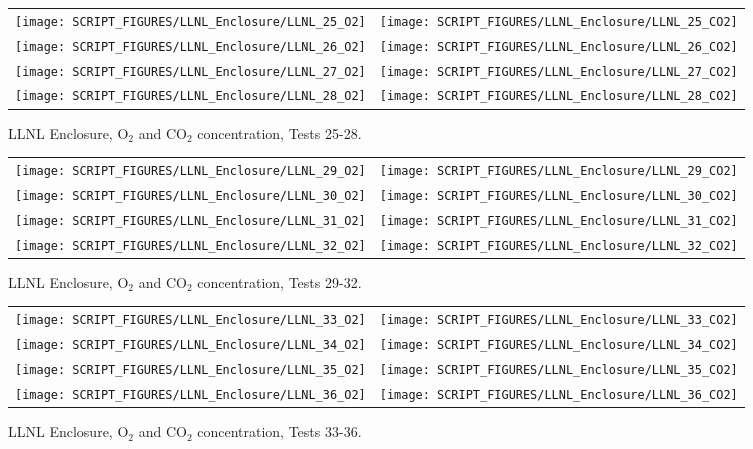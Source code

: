 \begin{figure}[p]
\begin{tabular*}{\textwidth}{l@{\extracolsep{\fill}}r}
\texttt{[image: SCRIPT\_FIGURES/LLNL\_Enclosure/LLNL\_25\_O2]} &
\texttt{[image: SCRIPT\_FIGURES/LLNL\_Enclosure/LLNL\_25\_CO2]} \\
\texttt{[image: SCRIPT\_FIGURES/LLNL\_Enclosure/LLNL\_26\_O2]} &
\texttt{[image: SCRIPT\_FIGURES/LLNL\_Enclosure/LLNL\_26\_CO2]} \\
\texttt{[image: SCRIPT\_FIGURES/LLNL\_Enclosure/LLNL\_27\_O2]} &
\texttt{[image: SCRIPT\_FIGURES/LLNL\_Enclosure/LLNL\_27\_CO2]} \\
\texttt{[image: SCRIPT\_FIGURES/LLNL\_Enclosure/LLNL\_28\_O2]} &
\texttt{[image: SCRIPT\_FIGURES/LLNL\_Enclosure/LLNL\_28\_CO2]}
\end{tabular*}
\caption{LLNL Enclosure, O$_2$ and CO$_2$ concentration, Tests 25-28.}
\label{LLNL_Gas_7}
\end{figure}

\begin{figure}[p]
\begin{tabular*}{\textwidth}{l@{\extracolsep{\fill}}r}
\texttt{[image: SCRIPT\_FIGURES/LLNL\_Enclosure/LLNL\_29\_O2]} &
\texttt{[image: SCRIPT\_FIGURES/LLNL\_Enclosure/LLNL\_29\_CO2]} \\
\texttt{[image: SCRIPT\_FIGURES/LLNL\_Enclosure/LLNL\_30\_O2]} &
\texttt{[image: SCRIPT\_FIGURES/LLNL\_Enclosure/LLNL\_30\_CO2]} \\
\texttt{[image: SCRIPT\_FIGURES/LLNL\_Enclosure/LLNL\_31\_O2]} &
\texttt{[image: SCRIPT\_FIGURES/LLNL\_Enclosure/LLNL\_31\_CO2]} \\
\texttt{[image: SCRIPT\_FIGURES/LLNL\_Enclosure/LLNL\_32\_O2]} &
\texttt{[image: SCRIPT\_FIGURES/LLNL\_Enclosure/LLNL\_32\_CO2]}
\end{tabular*}
\caption{LLNL Enclosure, O$_2$ and CO$_2$ concentration, Tests 29-32.}
\label{LLNL_Gas_8}
\end{figure}

\begin{figure}[p]
\begin{tabular*}{\textwidth}{l@{\extracolsep{\fill}}r}
\texttt{[image: SCRIPT\_FIGURES/LLNL\_Enclosure/LLNL\_33\_O2]} &
\texttt{[image: SCRIPT\_FIGURES/LLNL\_Enclosure/LLNL\_33\_CO2]} \\
\texttt{[image: SCRIPT\_FIGURES/LLNL\_Enclosure/LLNL\_34\_O2]} &
\texttt{[image: SCRIPT\_FIGURES/LLNL\_Enclosure/LLNL\_34\_CO2]} \\
\texttt{[image: SCRIPT\_FIGURES/LLNL\_Enclosure/LLNL\_35\_O2]} &
\texttt{[image: SCRIPT\_FIGURES/LLNL\_Enclosure/LLNL\_35\_CO2]} \\
\texttt{[image: SCRIPT\_FIGURES/LLNL\_Enclosure/LLNL\_36\_O2]} &
\texttt{[image: SCRIPT\_FIGURES/LLNL\_Enclosure/LLNL\_36\_CO2]}
\end{tabular*}
\caption{LLNL Enclosure, O$_2$ and CO$_2$ concentration, Tests 33-36.}
\label{LLNL_Gas_9}
\end{figure}

